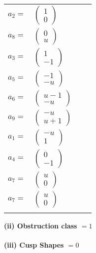 \documentclass[1p]{elsarticle_modified}
\theoremstyle{definition}
\begin{document}
\begin{tabular}{m{7pt} m{180pt} m{7pt} m{180pt} }
\flushright $a_{2}=$&$\begin{pmatrix}1\\0\end{pmatrix}$ \\
\flushright $a_{8}=$&$\begin{pmatrix}0\\u\end{pmatrix}$ \\
\flushright $a_{3}=$&$\begin{pmatrix}1\\-1\end{pmatrix}$ \\
\flushright $a_{5}=$&$\begin{pmatrix}-1\\- u\end{pmatrix}$ \\
\flushright $a_{6}=$&$\begin{pmatrix}u-1\\- u\end{pmatrix}$ \\
\flushright $a_{9}=$&$\begin{pmatrix}- u\\u+1\end{pmatrix}$ \\
\flushright $a_{1}=$&$\begin{pmatrix}- u\\1\end{pmatrix}$ \\
\flushright $a_{4}=$&$\begin{pmatrix}0\\-1\end{pmatrix}$ \\
\flushright $a_{7}=$&$\begin{pmatrix}u\\0\end{pmatrix}$\\ \flushright $a_{7}=$&$\begin{pmatrix}u\\0\end{pmatrix}$\\&\end{tabular}
\flushleft \textbf{(ii) Obstruction class $= 1$}\\~\\
\flushleft \textbf{(iii) Cusp Shapes $= 0$}\\~\\
\end{document}
